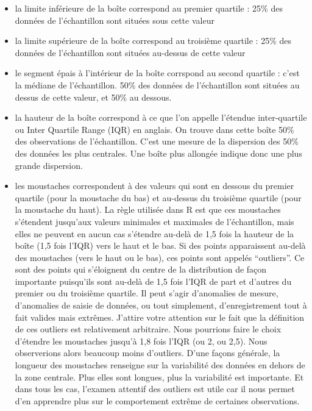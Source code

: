 \documentclass[a4paperpaper,]{article}
\providecommand{\tightlist}{%
  \setlength{\itemsep}{0pt}\setlength{\parskip}{0pt}}
\theoremstyle{definition}
\theoremstyle{definition}
\theoremstyle{definition}
\theoremstyle{remark}
\begin{document}
\begin{itemize}
\tightlist
\item
  la limite inférieure de la boîte correspond au premier quartile : 25\%
  des données de l'échantillon sont situées sous cette valeur
\item
  la limite supérieure de la boîte correspond au troisième quartile :
  25\% des données de l'échantillon sont situées au-dessus de cette
  valeur
\item
  le segment épais à l'intérieur de la boîte corrspond au second
  quartile : c'est la médiane de l'échantillon. 50\% des données de
  l'échantillon sont situées au dessus de cette valeur, et 50\% au
  dessous.
\item
  la hauteur de la boîte correspond à ce que l'on appelle l'étendue
  inter-quartile ou Inter Quartile Range (IQR) en anglais. On trouve
  dans cette boîte 50\% des observations de l'échantillon. C'est une
  mesure de la dispersion des 50\% des données les plus centrales. Une
  boîte plus allongée indique donc une plus grande dispersion.
\item
  les moustaches correspondent à des valeurs qui sont en dessous du
  premier quartile (pour la moustache du bas) et au-dessus du troisième
  quartile (pour la moustache du haut). La règle utilisée dans R est que
  ces moustaches s'étendent jusqu'aux valeurs minimales et maximales de
  l'échantillon, mais elles ne peuvent en aucun cas s'étendre au-delà de
  1,5 fois la hauteur de la boîte (1,5 fois l'IQR) vers le haut et le
  bas. Si des points apparaissent au-delà des moustaches (vers le haut
  ou le bas), ces points sont appelés ``outliers''. Ce sont des points
  qui s'éloignent du centre de la distribution de façon importante
  puisqu'ils sont au-delà de 1,5 fois l'IQR de part et d'autres du
  premier ou du troisième quartile. Il peut s'agir d'anomalies de
  mesure, d'anomalies de saisie de données, ou tout simplement,
  d'enregistrement tout à fait valides mais extrêmes. J'attire votre
  attention sur le fait que la définition de ces outliers est
  relativement arbitraire. Nous pourrions faire le choix d'étendre les
  moustaches jusqu'à 1,8 fois l'IQR (ou 2, ou 2,5). Nous observerions
  alors beaucoup moins d'outliers. D'une façons générale, la longueur
  des moustaches renseigne sur la variabilité des données en dehors de
  la zone centrale. Plus elles sont longues, plus la variabilité est
  importante. Et dans tous les cas, l'examen attentif des outliers est
  utile car il nous permet d'en apprendre plus sur le comportement
  extrême de certaines observations.
\end{itemize}
\end{document}

